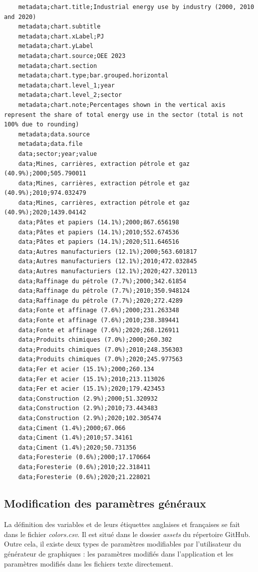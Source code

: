 \documentclass[11pt]{article}
\begin{document}
\begin{lstlisting}
    metadata;chart.title;Industrial energy use by industry (2000, 2010 and 2020)
    metadata;chart.subtitle
    metadata;chart.xLabel;PJ
    metadata;chart.yLabel
    metadata;chart.source;OEE 2023
    metadata;chart.section
    metadata;chart.type;bar.grouped.horizontal
    metadata;chart.level_1;year
    metadata;chart.level_2;sector
    metadata;chart.note;Percentages shown in the vertical axis represent the share of total energy use in the sector (total is not 100% due to rounding)
    metadata;data.source
    metadata;data.file
    data;sector;year;value
    data;Mines, carrières, extraction pétrole et gaz (40.9%);2000;505.790011
    data;Mines, carrières, extraction pétrole et gaz (40.9%);2010;974.032479
    data;Mines, carrières, extraction pétrole et gaz (40.9%);2020;1439.04142
    data;Pâtes et papiers (14.1%);2000;867.656198
    data;Pâtes et papiers (14.1%);2010;552.674536
    data;Pâtes et papiers (14.1%);2020;511.646516
    data;Autres manufacturiers (12.1%);2000;563.601817
    data;Autres manufacturiers (12.1%);2010;472.032845
    data;Autres manufacturiers (12.1%);2020;427.320113
    data;Raffinage du pétrole (7.7%);2000;342.61854
    data;Raffinage du pétrole (7.7%);2010;350.948124
    data;Raffinage du pétrole (7.7%);2020;272.4289
    data;Fonte et affinage (7.6%);2000;231.263348
    data;Fonte et affinage (7.6%);2010;238.389441
    data;Fonte et affinage (7.6%);2020;268.126911
    data;Produits chimiques (7.0%);2000;260.302
    data;Produits chimiques (7.0%);2010;248.356303
    data;Produits chimiques (7.0%);2020;245.977563
    data;Fer et acier (15.1%);2000;260.134
    data;Fer et acier (15.1%);2010;213.113026
    data;Fer et acier (15.1%);2020;179.423453
    data;Construction (2.9%);2000;51.320932
    data;Construction (2.9%);2010;73.443483
    data;Construction (2.9%);2020;102.305474
    data;Ciment (1.4%);2000;67.066
    data;Ciment (1.4%);2010;57.34161
    data;Ciment (1.4%);2020;50.731356
    data;Foresterie (0.6%);2000;17.170664
    data;Foresterie (0.6%);2010;22.318411
    data;Foresterie (0.6%);2020;21.228021
\end{lstlisting}


\subsection{Modification des paramètres généraux}
\label{subsec:modifParamGlobaux}

La définition des variables et de leurs étiquettes anglaises et françaises se fait dans le fichier \textit{colors.csv}. Il est situé dans le dossier \textit{assets} du répertoire GitHub.
Outre cela, il existe deux types de paramètres modifiables par l'utilisateur du générateur de graphiques : les paramètres modifiés dans l'application et les paramètres modifiés dans les fichiers texte directement.
\end{document}
